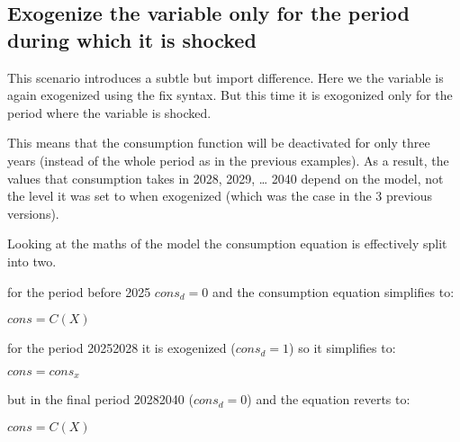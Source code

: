 \documentclass[letterpaper,10pt,english]{jupyterBook}
\begin{document}
\subsection{Exogenize the variable only for the period during which it is shocked}
\label{\detokenize{content/05_WBModels/ScenarioAnalysis:exogenize-the-variable-only-for-the-period-during-which-it-is-shocked}}
\sphinxAtStartPar
This scenario introduces a subtle but import difference.  Here we the variable is again exogenized using the fix syntax. But this time it is exogonized only for the period where the variable is shocked.

\sphinxAtStartPar
This means that the consumption function will be de\sphinxhyphen{}activated for only three years (instead of the whole period as in the previous examples).  As a result, the values that consumption takes in 2028, 2029, … 2040 depend on the model, not the level it was set to when exogenized (which was the case in the 3 previous versions).

\sphinxAtStartPar
Looking at the maths of the model the consumption equation is effectively split into two.

\sphinxAtStartPar
for the period before 2025 \(cons_d=0\) and the consumption equation simplifies to:

\sphinxAtStartPar
\(cons=C(X)\)

\sphinxAtStartPar
for the period 2025\sphinxhyphen{}2028 it is exogenized (\(cons_d=1\)) so it simplifies to:

\sphinxAtStartPar
\(cons=cons_x\)

\sphinxAtStartPar
but in the final period 2028\sphinxhyphen{}2040 (\(cons_d=0\)) and the equation reverts to:

\sphinxAtStartPar
\(cons=C(X)\)
\end{document}
